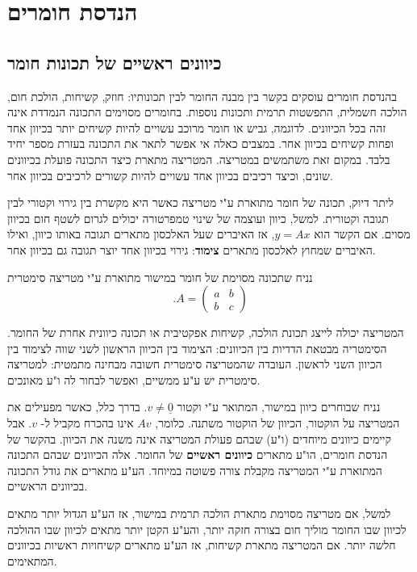 \documentclass[12pt]{report}
\theoremstyle{plain}
\theoremstyle{definition}
\newcommand{\0}{\mathbf{0}}
\begin{document}
\section{הנדסת חומרים}

\subsection*{כיוונים ראשיים של תכונות חומר}

בהנדסת חומרים עוסקים בקשר בין מבנה החומר לבין תכונותיו:
חוזק, קשיחות, הולכת חום, הולכה חשמלית, התפשטות תרמית ותכונות נוספות.
בחומרים מסוימים התכונה הנמדדת אינה זהה בכל הכיוונים.
לדוגמה, גביש או חומר מרוכב עשויים להיות קשיחים יותר בכיוון אחד ופחות קשיחים בכיוון אחר. במצבים כאלה אי אפשר לתאר את התכונה בעזרת מספר יחיד בלבד. במקום זאת משתמשים במטריצה.
המטריצה מתארת כיצד התכונה פועלת בכיוונים שונים, וכיצד רכיבים בכיוון אחד עשויים להיות קשורים לרכיבים בכיוון אחר.

ליתר דיוק, תכונה של חומר מתוארת ע"י מטריצה כאשר היא מקשרת בין גירוי וקטורי לבין תגובה וקטורית.
למשל, כיוון ועוצמה של שינוי טמפרטורה יכולים לגרום לשטף חום בכיוון מסוים.
אם הקשר הוא
$y=Ax$,
אז האיברים שעל האלכסון מתארים תגובה באותו כיוון, ואילו האיברים שמחוץ לאלכסון מתארים \textbf{צימוד}: גירוי בכיוון אחד יוצר תגובה גם בכיוון אחר.

נניח שתכונה מסוימת של חומר במישור מתוארת ע"י מטריצה סימטרית
$$
.A =
\begin{pmatrix}
a & b \\
b & c
\end{pmatrix}
$$

המטריצה יכולה לייצג תכונת הולכה, קשיחות אפקטיבית או תכונה כיוונית אחרת של החומר.
הסימטריה מבטאת הדדיות בין הכיוונים: הצימוד בין הכיוון הראשון לשני שווה לצימוד בין הכיוון השני לראשון.
העובדה שהמטריצה סימטרית חשובה מבחינה מתמטית:
למטריצה סימטרית יש ע"ע ממשיים, ואפשר לבחור לה ו"ע מאונכים. 

נניח שבוחרים כיוון במישור, המתואר ע"י וקטור
$v\neq\underline{0}$.
בדרך כלל, כאשר מפעילים את המטריצה על הוקטור, הכיוון של הוקטור משתנה.
כלומר,
$Av$
אינו בהכרח מקביל ל-
$v$.
אבל קיימים כיוונים מיוחדים (ו"ע) שבהם פעולת המטריצה אינה משנה את הכיוון.
בהקשר של הנדסת חומרים, הו"ע מתארים
\textbf{כיוונים ראשיים} של החומר.
אלה הכיוונים שבהם התכונה המתוארת ע"י המטריצה מקבלת צורה פשוטה במיוחד.
הע"ע מתארים את גודל התכונה בכיוונים הראשיים.

למשל, אם מטריצה מסוימת מתארת הולכה תרמית במישור, אז הע"ע הגדול יותר מתאים לכיוון שבו החומר מוליך חום בצורה חזקה יותר, והע"ע הקטן יותר מתאים לכיוון שבו ההולכה חלשה יותר.
אם המטריצה מתארת קשיחות, אז הע"ע מתארים קשיחויות ראשיות בכיוונים המתאימים.
\end{document}
